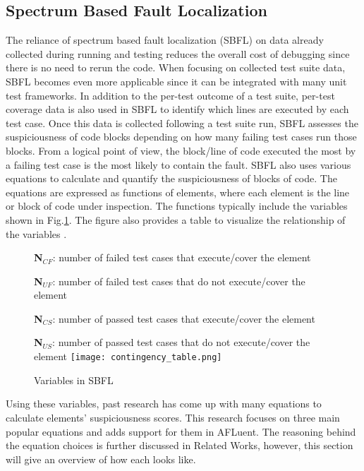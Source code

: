\subsection{Spectrum Based Fault Localization}
\label{subsec:SpectrumBased}

The reliance of spectrum based fault localization (SBFL) on data already
collected during running and testing reduces the overall cost of debugging since
there is no need to rerun the code. When focusing on collected test suite data,
SBFL becomes even more applicable since it can be integrated with many unit test
frameworks. In addition to the per-test outcome of a test suite, per-test
coverage data is also used in SBFL to identify which lines are executed by each
test case. Once this data is collected following a test suite run, SBFL assesses
the suspiciousness of code blocks depending on how many failing test cases run
those blocks. From a logical point of view, the block/line of code executed the
most by a failing test case is the most likely to contain the fault. SBFL also
uses various equations to calculate and quantify the
suspiciousness of blocks of code. The equations are expressed as functions of
elements, where each element is the line or block of code under inspection. The
functions typically include the variables shown in
Fig.\ref{fig:contingency_table}. The figure also provides a table to visualize
the relationship of the variables \cite{Wong2014DStar}.

\begin{figure}[!htb]
	\begin{center}
		\textbf{N$_{CF}$}: number of failed test cases that execute/cover the element

		\textbf{N$_{UF}$}: number of failed test cases that do not execute/cover the element

		\textbf{N$_{CS}$}: number of passed test cases that execute/cover the element

		\textbf{N$_{US}$}: number of passed test cases that do not execute/cover the element
		\texttt{[image: contingency\_table.png]}
		\caption{\label{fig:contingency_table} Variables in SBFL}
	\end{center}
\end{figure}

Using these variables, past research has come up with many equations to
calculate elements' suspiciousness scores. This research focuses on three main
popular equations and adds support for them in AFLuent. The reasoning behind the
equation choices is further discussed in Related Works, however, this section
will give an overview of how each looks like.

